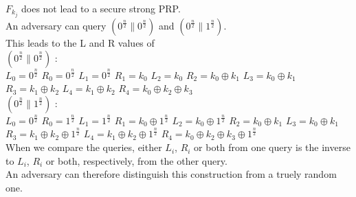 $F_{k_{j}}$ does not lead to a secure strong PRP.\\
An adversary can query $(0^{\frac{n}{2}} \parallel 0^{\frac{n}{2}})$ and $(0^{\frac{n}{2}} \parallel 1^{\frac{n}{2}})$.\\
This leads to the L and R values of\\
$(0^{\frac{n}{2}} \parallel 0^{\frac{n}{2}})$ :\\
$L_{0} = 0^{\frac{n}{2}}$ $R_{0} = 0^{\frac{n}{2}}$
$L_{1} = 0^{\frac{n}{2}}$ $R_{1} = k_{0}$
$L_{2} = k_{0}$ $R_{2} = k_{0} \oplus k_{1}$
$L_{3} = k_{0} \oplus k_{1}$ $R_{3} = k_{1} \oplus k_{2}$
$L_{4} = k_{1} \oplus k_{2}$ $R_{4} = k_{0} \oplus k_{2} \oplus k_{3}$
\\
$(0^{\frac{n}{2}} \parallel 1^{\frac{n}{2}})$ :\\
$L_{0} = 0^{\frac{n}{2}}$ $R_{0} = 1^{\frac{n}{2}}$
$L_{1} = 1^{\frac{n}{2}}$ $R_{1} = k_{0} \oplus 1^{\frac{n}{2}}$
$L_{2} = k_{0} \oplus 1^{\frac{n}{2}}$ $R_{2} = k_{0} \oplus k_{1}$
$L_{3} = k_{0} \oplus k_{1}$ $R_{3} = k_{1} \oplus k_{2} \oplus 1^{\frac{n}{2}}$
$L_{4} = k_{1} \oplus k_{2} \oplus 1^{\frac{n}{2}}$ $R_{4} = k_{0} \oplus k_{2} \oplus k_{3} \oplus 1^{\frac{n}{2}}$\\
When we compare the queries, either $L_{i}$,  $R_{i}$ or both from one query is the inverse to $L_{i}$,  $R_{i}$ or both, respectively, from the other query.\\
An adversary can therefore distinguish this construction from a truely random one.

